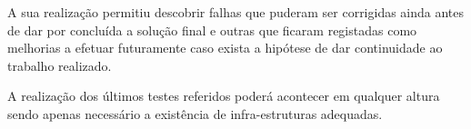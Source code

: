 	A sua realização permitiu descobrir falhas que puderam ser corrigidas ainda antes de dar por concluída a solução final e outras que ficaram registadas como melhorias a efetuar futuramente caso exista a hipótese de dar continuidade ao trabalho realizado.

	A realização dos últimos testes referidos poderá acontecer em qualquer altura sendo apenas necessário a existência de infra-estruturas adequadas.



	

